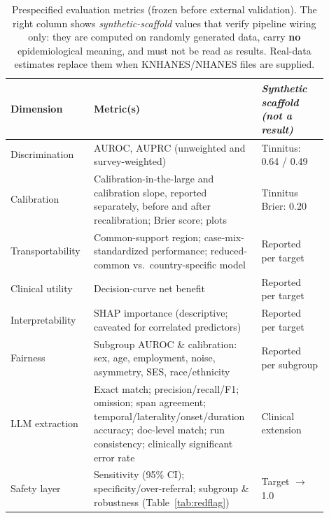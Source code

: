 \begin{table}[htbp]
\centering
\caption{Prespecified evaluation metrics (frozen before external validation). The right column shows \emph{synthetic-scaffold} values that verify pipeline wiring only: they are computed on randomly generated data, carry \textbf{no} epidemiological meaning, and must not be read as results. Real-data estimates replace them when KNHANES/NHANES files are supplied.}
\label{tab:metrics}
\small
\begin{tabular}{p{0.24\linewidth}p{0.46\linewidth}p{0.20\linewidth}}
\toprule
Dimension & Metric(s) & \textit{Synthetic scaffold (not a result)} \\
\midrule
Discrimination & AUROC, AUPRC (unweighted and survey-weighted) & Tinnitus: 0.64 / 0.49 \\
Calibration & Calibration-in-the-large and calibration slope, reported separately, before and after recalibration; Brier score; plots & Tinnitus Brier: 0.20 \\
Transportability & Common-support region; case-mix-standardized performance; reduced-common vs.\ country-specific model & Reported per target \\
Clinical utility & Decision-curve net benefit & Reported per target \\
Interpretability & SHAP importance (descriptive; caveated for correlated predictors) & Reported per target \\
Fairness & Subgroup AUROC \& calibration: sex, age, employment, noise, asymmetry, SES, race/ethnicity & Reported per subgroup \\
LLM extraction & Exact match; precision/recall/F1; omission; span agreement; temporal/laterality/onset/duration accuracy; doc-level match; run consistency; clinically significant error rate & Clinical extension \\
Safety layer & Sensitivity (95\% CI); specificity/over-referral; subgroup \& robustness (Table~\ref{tab:redflag}) & Target $\rightarrow$ 1.0 \\
\bottomrule
\end{tabular}
\end{table}
